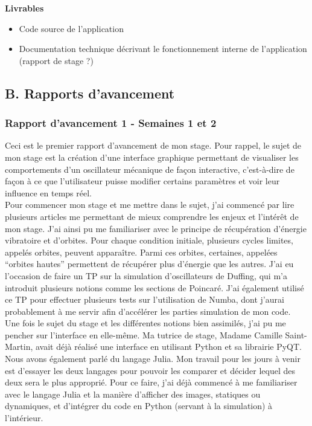 \documentclass[a4paper, french, 12pt, titlepage]{article}
\begin{document}
\textbf{Livrables} 
\begin{itemize}

\item Code source de l'application
\item Documentation technique décrivant le fonctionnement interne de l'application (rapport de stage ?)
\end{itemize}


\newpage



\subsection*{B. Rapports d'avancement}

\subsubsection*{Rapport d'avancement 1 - Semaines 1 et 2}

Ceci est le premier rapport d’avancement de mon stage. Pour rappel, le sujet de mon stage est la création d’une interface graphique permettant de visualiser les comportements d’un oscillateur mécanique de façon interactive, c’est-à-dire de façon à ce que l’utilisateur puisse modifier certains paramètres et voir leur influence en temps réel. \\

	Pour commencer mon stage et me mettre dans le sujet, j’ai commencé par lire plusieurs articles me permettant de mieux comprendre les enjeux et l’intérêt de mon stage. J’ai ainsi pu me familiariser avec le principe de récupération d’énergie vibratoire et d’orbites. Pour chaque condition initiale, plusieurs cycles limites, appelés orbites, peuvent apparaître. Parmi ces orbites, certaines, appelées “orbites hautes” permettent de récupérer plus d’énergie que les autres. J’ai eu l’occasion de faire un TP sur la simulation d'oscillateurs de Duffing, qui m’a introduit plusieurs notions comme les sections de Poincaré. J’ai également utilisé ce TP pour effectuer plusieurs tests sur l’utilisation de Numba, dont j’aurai probablement à me servir afin d’accélérer les parties simulation de mon code.\\
	 
	Une fois le sujet du stage et les différentes notions bien assimilés, j’ai pu me pencher sur l’interface en elle-même. Ma tutrice de stage, Madame Camille Saint-Martin, avait déjà réalisé une interface en utilisant Python et sa librairie PyQT. Nous avons également parlé du langage Julia. Mon travail pour les jours à venir est d’essayer les deux langages pour pouvoir les comparer et décider lequel des deux sera le plus approprié. Pour ce faire, j’ai déjà commencé à me familiariser avec le langage Julia et la manière d’afficher des images, statiques ou dynamiques, et d’intégrer du code en Python (servant à la simulation) à l’intérieur.  \\
	
\end{document}
